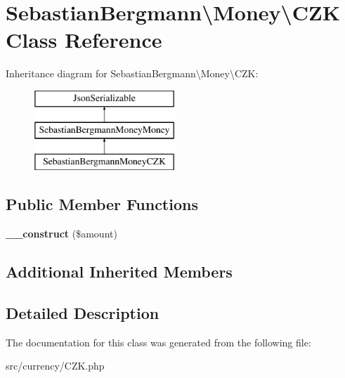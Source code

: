 \hypertarget{classSebastianBergmann_1_1Money_1_1CZK}{}\section{Sebastian\+Bergmann\textbackslash{}Money\textbackslash{}C\+Z\+K Class Reference}
\label{classSebastianBergmann_1_1Money_1_1CZK}
Inheritance diagram for Sebastian\+Bergmann\textbackslash{}Money\textbackslash{}C\+Z\+K\+:\begin{figure}[H]
\begin{center}
\leavevmode
\includegraphics[height=3.000000cm]{classSebastianBergmann_1_1Money_1_1CZK}
\end{center}
\end{figure}
\subsection*{Public Member Functions}
\begin{DoxyCompactItemize}
\item 
\hypertarget{classSebastianBergmann_1_1Money_1_1CZK_ac16b0724b4608eeb8f14a5e9404e1072}{}{\bfseries \+\_\+\+\_\+construct} (\$amount)\label{classSebastianBergmann_1_1Money_1_1CZK_ac16b0724b4608eeb8f14a5e9404e1072}

\end{DoxyCompactItemize}
\subsection*{Additional Inherited Members}


\subsection{Detailed Description}


The documentation for this class was generated from the following file\+:\begin{DoxyCompactItemize}
\item 
src/currency/C\+Z\+K.\+php\end{DoxyCompactItemize}
